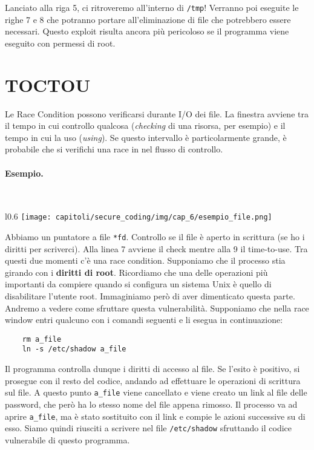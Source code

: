 Lanciato alla riga 5, ci ritroveremo all'interno di \verb|/tmp|!
Verranno poi eseguite le righe 7 e 8 che potranno portare all'eliminazione
di file che potrebbero essere necessari. Questo exploit risulta ancora più
pericoloso se il programma viene eseguito con permessi di root.

\section{TOCTOU}

Le Race Condition possono verificarsi durante I/O dei file.
La finestra avviene tra il tempo in cui controllo qualcosa
(\textit{checking} di una risorsa, per e\-sempio) e il tempo in cui la uso (\textit{using}).
Se questo intervallo è particolarmente grande, è probabile che si verifichi una race in nel flusso di controllo.

\paragraph{Esempio.}\ \\

\begin{wrapfigure}{l}{0.6\textwidth}
    \centering
    \texttt{[image: capitoli/secure\_coding/img/cap\_6/esempio\_file.png]}
\end{wrapfigure}

Abbiamo un puntatore a file \verb|*fd|.
Controllo se il file è aperto in scrittura (se ho i diritti per scriverci).
Alla linea 7 avviene il check mentre alla 9 il time-to-use.
Tra questi due momenti c'è una race condition.
Supponiamo che il processo stia girando con i \textbf{diritti di root}.
Ricordiamo che una delle ope\-razioni più importanti da compiere quando si configura
un sistema Unix è quello di disabilitare l'utente root.
Immaginiamo però di aver dimenticato questa parte. Andremo a vedere come sfruttare
questa vulnerabilità.
Supponiamo che nella race window entri qualcuno con i comandi seguenti e li esegua in continuazione:

\begin{lstlisting}
    rm a_file
    ln -s /etc/shadow a_file
\end{lstlisting}

Il programma controlla dunque i diritti di accesso al file.
Se l'esito è positivo, si prosegue con il resto del codice, andando ad effettuare
le operazioni di scrittura sul file.
A questo punto \verb|a_file| viene cancellato e viene creato un link al file delle password,
che però ha lo stesso nome del file appena rimosso. Il processo va ad aprire \verb|a_file|,
ma è stato sostituito con il link e compie le azioni successive su di esso.
Siamo quindi riusciti a scrivere nel file \verb|/etc/shadow| sfruttando il codice
vulnerabile di questo programma.

